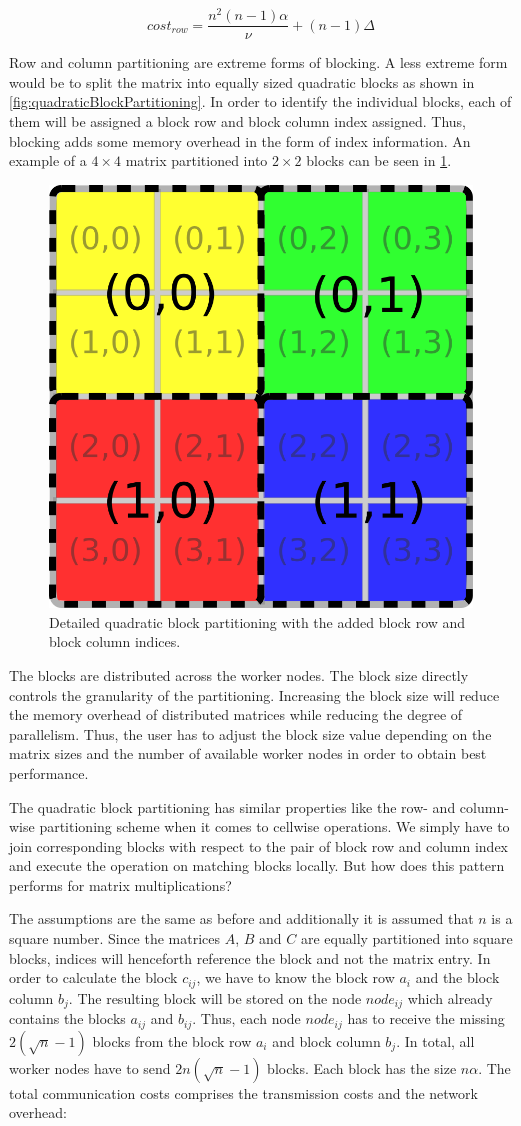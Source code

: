 \begin{displaymath}
	cost_{row} = \frac{n^2(n-1)\alpha}{\nu} + (n-1)\Delta
\end{displaymath}

Row and column partitioning are extreme forms of blocking.
A less extreme form would be to split the matrix into equally sized quadratic blocks as shown in \cref{fig:quadraticBlockPartitioning}.
In order to identify the individual blocks, each of them will be assigned a block row and block column index assigned.
Thus, blocking adds some memory overhead in the form of index information.
An example of a $4\times 4$ matrix partitioned into $2\times 2$ blocks can be seen in \cref{fig:quadraticBlockPartitioningDetailed}.

\begin{figure}[!h]
	\centering
	\includegraphics[width=0.25\linewidth]{images/quadraticBlockPartitioningDetailed.png}
	\caption{Detailed quadratic block partitioning with the added block row and block column indices.}
	\label{fig:quadraticBlockPartitioningDetailed}
\end{figure}

The blocks are distributed across the worker nodes.
The block size directly controls the granularity of the partitioning.
Increasing the block size will reduce the memory overhead of distributed matrices while reducing the degree of parallelism.
Thus, the user has to adjust the block size value depending on the matrix sizes and the number of available worker nodes in order to obtain best performance.

The quadratic block partitioning has similar properties like the row- and column-wise partitioning scheme when it comes to cellwise operations.
We simply have to join corresponding blocks with respect to the pair of block row and column index and execute the operation on matching blocks locally.
But how does this pattern performs for matrix multiplications?

The assumptions are the same as before and additionally it is assumed that $n$ is a square number.
Since the matrices $A$, $B$ and $C$ are equally partitioned into square blocks, indices will henceforth reference the block and not the matrix entry.
In order to calculate the block $c_{ij}$, we have to know the block row $a_{i}$ and the block column $b_{j}$.
The resulting block will be stored on the node $node_{ij}$ which already contains the blocks $a_{ij}$ and $b_{ij}$.
Thus, each node $node_{ij}$ has to receive the missing $2\left(\sqrt{n}-1\right)$ blocks from the block row $a_{i}$ and block column $b_{j}$.
In total, all worker nodes have to send $2n\left(\sqrt{n}-1\right)$ blocks.
Each block has the size $n\alpha$.
The total communication costs comprises the transmission costs and the network overhead:

